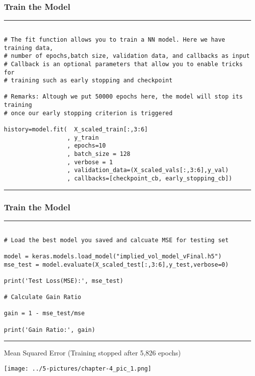 \documentclass[11pt]{beamer}
\begin{document}
\begin{frame}[fragile]
\frametitle{Train the Model}
\scriptsize
\rule{\textwidth}{1pt}
\begin{verbatim}

# The fit function allows you to train a NN model. Here we have training data, 
# number of epochs,batch size, validation data, and callbacks as input
# Callback is an optional parameters that allow you to enable tricks for 
# training such as early stopping and checkpoint

# Remarks: Altough we put 50000 epochs here, the model will stop its training 
# once our early stopping criterion is triggered

history=model.fit(  X_scaled_train[:,3:6]
                  , y_train
                  , epochs=10
                  , batch_size = 128
                  , verbose = 1
                  , validation_data=(X_scaled_vals[:,3:6],y_val)
                  , callbacks=[checkpoint_cb, early_stopping_cb])

\end{verbatim}
\rule{\textwidth}{1pt}
\end{frame}
\begin{frame}[fragile]
\frametitle{Train the Model}
\scriptsize
\rule{\textwidth}{1pt}
\begin{verbatim}

# Load the best model you saved and calcuate MSE for testing set

model = keras.models.load_model("implied_vol_model_vFinal.h5")
mse_test = model.evaluate(X_scaled_test[:,3:6],y_test,verbose=0)

print('Test Loss(MSE):', mse_test)

# Calculate Gain Ratio

gain = 1 - mse_test/mse 

print('Gain Ratio:', gain)

\end{verbatim}
\rule{\textwidth}{1pt}
\end{frame}
\begin{frame}{Mean Squared Error (Training stopped after 5,826 epochs)}
	 
	\begin{center}
	\texttt{[image: ../5-pictures/chapter-4\_pic\_1.png]}
	\end{center}
\end{frame}
\end{document}
